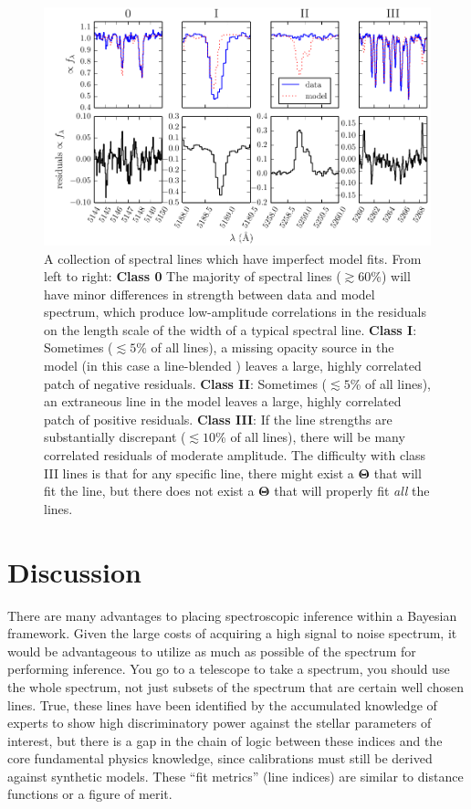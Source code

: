 \documentclass[iop,floatfix]{emulateapj}
\newcommand{\vT}{ {\bm \Theta}}
\begin{document}
\begin{figure}[!htb]
\begin{center}
  \includegraphics{figs/badlines.pdf}
  \caption{A collection of spectral lines which have imperfect model fits.
    From left to right: \textbf{Class 0} The majority of spectral lines
    ($\gtrsim 60$\%) will have minor differences in strength between data and
    model spectrum, which produce low-amplitude correlations in the residuals
    on the length scale of the width of a typical spectral line.  \textbf{Class
    I}: Sometimes ($\lesssim 5$\% of all lines), a missing opacity source in
    the model (in this case a line-blended ) leaves a large, highly correlated
    patch of negative residuals.  \textbf{Class II}: Sometimes ($\lesssim 5$\%
    of all lines), an extraneous line in the model leaves a large, highly
    correlated patch of positive residuals.  \textbf{Class III}: If the line strengths are
    substantially discrepant ($\lesssim 10$\% of all lines), there will be many
    correlated residuals of moderate amplitude.  The difficulty
    with class III lines is that for any specific line, there might exist a
    $\vT$ that will fit the line, but there does not exist a $\vT$ that
    will properly fit \emph{all} the lines.}
\label{fig:badlines}
\end{center}
\end{figure}

\section{Discussion}
\label{sec:discussion}
There are many advantages to placing spectroscopic inference within a Bayesian framework. Given the large costs of acquiring a high signal to noise spectrum, it would be advantageous to utilize as much as possible of the spectrum for performing inference. You go to a telescope to take a spectrum, you should use the whole spectrum, not just subsets of the spectrum that are certain well chosen lines. True, these lines have been identified by the accumulated knowledge of experts to show high discriminatory power against the stellar parameters of interest, but there is a gap in the chain of logic between these indices and the core fundamental physics knowledge, since calibrations must still be derived against synthetic models. These ``fit metrics'' (line indices) are similar to distance functions or a figure of merit.
\end{document}
